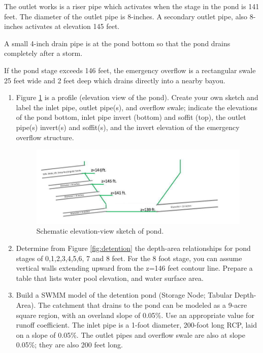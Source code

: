\documentclass[12pt]{article}
\begin{document}
The outlet works is a riser pipe which activates when the stage in the pond is 141 feet.
The diameter of the outlet pipe is 8-inches.
A secondary outlet pipe, also 8-inches activates at elevation 145 feet.

A small 4-inch drain pipe is at the pond bottom so that the pond drains completely after a storm.

If the pond stage exceeds 146 feet, the emergency overflow is a rectangular swale 25 feet wide and 2 feet deep which drains directly into a nearby bayou.

\begin{enumerate}
\item Figure \ref{fig:side-view} is a profile (elevation view of the pond).  Create your own sketch and label the inlet pipe, outlet pipe(s), and overflow swale; indicate the elevations of the pond bottom, inlet pipe invert (bottom) and soffit (top), the outlet pipe(s) invert(s) and soffit(s), and the invert elevation of the emergency overflow structure.
\begin{figure}[h!] %
   \centering
   \includegraphics[width=6in]{side-view.jpg} 
   \caption{Schematic elevation-view sketch of pond.}
   \label{fig:side-view}
\end{figure}
\item Determine from Figure \ref{fig:detention} the depth-area relationships for pond stages of 0,1,2,3,4,5,6, 7 and 8 feet.   For the 8 foot stage, you can assume vertical walls extending upward from the z=146 feet contour line.   Prepare a table that lists water pool elevation, and water surface area.  
\item Build a SWMM model of the detention pond (Storage Node; Tabular Depth-Area).   
The catchment that drains to the pond can be modeled as a 9-acre square region, with an overland slope of 0.05\%.
Use an appropriate value for runoff coefficient.   
The inlet pipe is a 1-foot diameter, 200-foot long RCP, laid on a slope of 0.05\%.
The outlet pipes and overflow swale are also at slope 0.05\%; they are also 200 feet long.


\end{enumerate}
\end{document}
